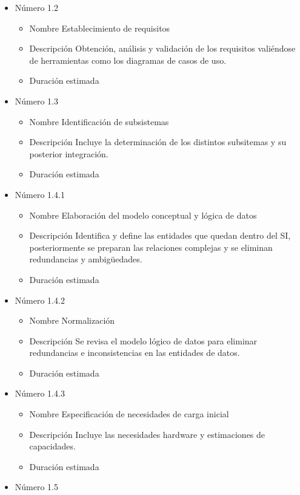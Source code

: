 \documentclass[11pt,a4paper,spanish,twoside]{report}
\begin{document}
\begin{itemize}
\begin{itemize}
\begin{itemize}
\end{itemize}
\item{Número} 1.2
\begin{itemize}
\item{Nombre} Establecimiento de requisitos
\item{Descripción} Obtención, análisis y validación de los requisitos
  valiéndose de herramientas como los diagramas de casos de uso.
\item{Duración estimada} 
\end{itemize}
\item{Número} 1.3
\begin{itemize}
\item{Nombre} Identificación de subsistemas
\item{Descripción} Incluye la determinación de los distintos subsitemas y su
  posterior integración.
\item{Duración estimada} 
\end{itemize}
\item{Número} 1.4.1
\begin{itemize}
\item{Nombre} Elaboración del modelo conceptual y lógica de datos
\item{Descripción} Identifica y define las entidades que quedan dentro del
  SI, posteriormente se preparan las relaciones complejas y se eliminan
  redundancias y ambigüedades.
\item{Duración estimada} 
\end{itemize}
\item{Número} 1.4.2
\begin{itemize}
\item{Nombre} Normalización
\item{Descripción} Se revisa el modelo lógico de datos para eliminar
  redundancias e inconsistencias en las entidades de datos.
\item{Duración estimada} 
\end{itemize}
\item{Número} 1.4.3
\begin{itemize}
\item{Nombre} Especificación de necesidades de carga inicial
\item{Descripción} Incluye las necesidades hardware y estimaciones de
  capacidades.
\item{Duración estimada} 
\end{itemize}
\item{Número} 1.5
\begin{itemize}

\end{itemize}
\end{itemize}
\end{itemize}
\end{document}
